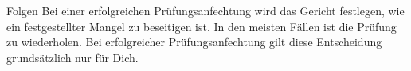 \begin{artikel}{Folgen}
Bei einer erfolgreichen Prüfungsanfechtung wird das Gericht festlegen, wie ein festgestellter Mangel zu beseitigen ist. In den meisten Fällen ist die Prüfung zu wiederholen. Bei erfolgreicher Prüfungsanfechtung gilt diese Entscheidung grundsätzlich nur für Dich.
\end{artikel}
